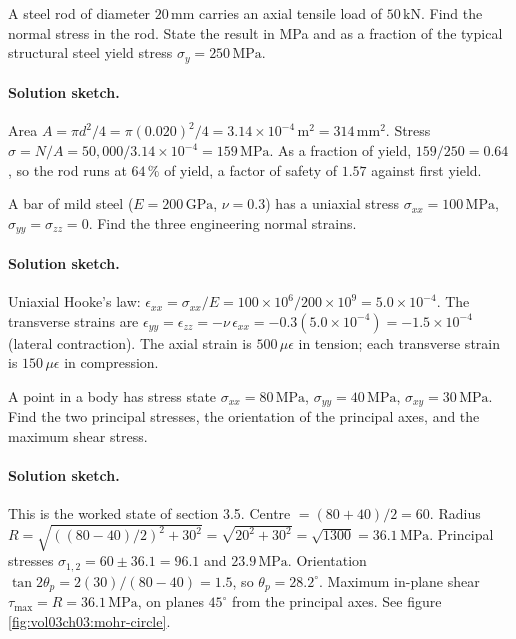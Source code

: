 \begin{exercise}
A steel rod of diameter $20\,\si{\milli\meter}$ carries an axial
tensile load of $50\,\text{kN}$. Find the normal stress in the rod.
State the result in MPa and as a fraction of the typical structural
steel yield stress $\sigma_y = 250\,\text{MPa}$.
\paragraph{Solution sketch.} Area $A = \pi d^2/4 = \pi(0.020)^2/4 =
3.14\times 10^{-4}\,\si{\meter}^2 = 314\,\si{\milli\meter}^2$. Stress
$\sigma = N/A = 50{,}000/3.14\times 10^{-4} = 159\,\text{MPa}$. As a
fraction of yield, $159/250 = 0.64$, so the rod runs at $64\,\%$ of
yield, a factor of safety of $1.57$ against first yield.
\end{exercise}

\begin{exercise}
A bar of mild steel ($E = 200\,\text{GPa}$, $\nu = 0.3$) has a
uniaxial stress $\sigma_{xx} = 100\,\text{MPa}$, $\sigma_{yy} =
\sigma_{zz} = 0$. Find the three engineering normal strains.
\paragraph{Solution sketch.} Uniaxial Hooke's law: $\epsilon_{xx} =
\sigma_{xx}/E = 100\times 10^6 / 200\times 10^9 = 5.0\times 10^{-4}$.
The transverse strains are $\epsilon_{yy} = \epsilon_{zz} = -\nu\,
\epsilon_{xx} = -0.3(5.0\times 10^{-4}) = -1.5\times 10^{-4}$ (lateral
contraction). The axial strain is $500\,\mu\epsilon$ in tension; each
transverse strain is $150\,\mu\epsilon$ in compression.
\end{exercise}

\begin{exercise}
A point in a body has stress state $\sigma_{xx} = 80\,\text{MPa}$,
$\sigma_{yy} = 40\,\text{MPa}$, $\sigma_{xy} = 30\,\text{MPa}$. Find
the two principal stresses, the orientation of the principal axes,
and the maximum shear stress.
\paragraph{Solution sketch.} This is the worked state of section 3.5.
Centre $= (80+40)/2 = 60$. Radius $R = \sqrt{((80-40)/2)^2 + 30^2} =
\sqrt{20^2 + 30^2} = \sqrt{1300} = 36.1\,\text{MPa}$. Principal stresses
$\sigma_{1,2} = 60 \pm 36.1 = 96.1$ and $23.9\,\text{MPa}$. Orientation
$\tan 2\theta_p = 2(30)/(80-40) = 1.5$, so $\theta_p = 28.2^{\circ}$.
Maximum in-plane shear $\tau_{\max} = R = 36.1\,\text{MPa}$, on planes
$45^{\circ}$ from the principal axes. See figure
\ref{fig:vol03ch03:mohr-circle}.
\end{exercise}

